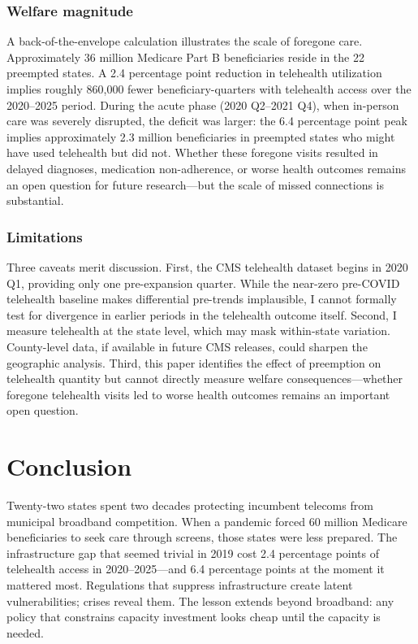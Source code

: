 \documentclass[12pt]{article}
\begin{document}
\subsubsection*{Welfare magnitude} A back-of-the-envelope calculation illustrates the scale of foregone care. Approximately 36 million Medicare Part B beneficiaries reside in the 22 preempted states. A 2.4 percentage point reduction in telehealth utilization implies roughly 860,000 fewer beneficiary-quarters with telehealth access over the 2020--2025 period. During the acute phase (2020 Q2--2021 Q4), when in-person care was severely disrupted, the deficit was larger: the 6.4 percentage point peak implies approximately 2.3 million beneficiaries in preempted states who might have used telehealth but did not. Whether these foregone visits resulted in delayed diagnoses, medication non-adherence, or worse health outcomes remains an open question for future research---but the scale of missed connections is substantial.

\subsubsection*{Limitations} Three caveats merit discussion. First, the CMS telehealth dataset begins in 2020 Q1, providing only one pre-expansion quarter. While the near-zero pre-COVID telehealth baseline makes differential pre-trends implausible, I cannot formally test for divergence in earlier periods in the telehealth outcome itself. Second, I measure telehealth at the state level, which may mask within-state variation. County-level data, if available in future CMS releases, could sharpen the geographic analysis. Third, this paper identifies the effect of preemption on telehealth quantity but cannot directly measure welfare consequences---whether foregone telehealth visits led to worse health outcomes remains an important open question.


\section{Conclusion}

Twenty-two states spent two decades protecting incumbent telecoms from municipal broadband competition. When a pandemic forced 60 million Medicare beneficiaries to seek care through screens, those states were less prepared. The infrastructure gap that seemed trivial in 2019 cost 2.4 percentage points of telehealth access in 2020--2025---and 6.4 percentage points at the moment it mattered most. Regulations that suppress infrastructure create latent vulnerabilities; crises reveal them. The lesson extends beyond broadband: any policy that constrains capacity investment looks cheap until the capacity is needed.
\end{document}
